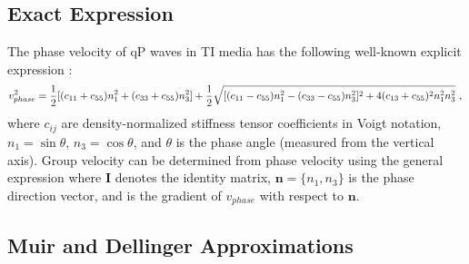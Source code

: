 \subsection{Exact Expression}

The phase velocity of qP waves in TI media has the following well-known explicit expression \cite[]{gass,berryman}:
\begin{equation}
\label{eq:exactphase}
v^2_{phase} = \frac{1}{2}[(c_{11}+c_{55})n^2_1 + (c_{33}+c_{55})n^2_3] + \frac{1}{2}\sqrt{[(c_{11}-c_{55})n^2_1 - (c_{33}-c_{55})n^2_3]^2 + 4(c_{13}+c_{55})^2n^2_1n^2_3}~,\\
\end{equation}
where $c_{ij}$ are density-normalized stiffness tensor coefficients in Voigt notation, $n_1 = \sin\theta$, $n_3 = \cos\theta $, and $\theta$ is the phase angle 
(measured from the vertical axis). Group velocity can be determined from phase velocity using the general expression \cite[]{cerveny}
where $\mathbf{I}$ denotes the identity matrix, $\mathbf{n}=\{n_1,n_3\}$ is the phase direction vector, and   is 
the gradient of $v_{phase}$ with respect to $\mathbf{n}$.  

\subsection{Muir and Dellinger Approximations}

